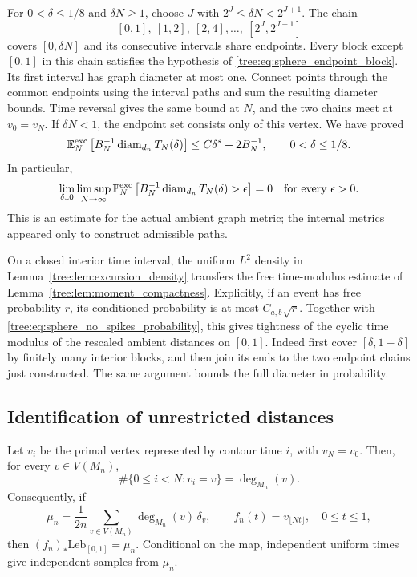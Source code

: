 For $0<\delta\leq1/8$ and $\delta N\geq1$, choose $J$ with
$2^J\leq\delta N<2^{J+1}$.  The chain
\[
 [0,1],\ [1,2],\ [2,4],\ldots,\ [2^J,2^{J+1}]
\]
covers $[0,\delta N]$ and its consecutive intervals share endpoints.
Every block except $[0,1]$ in this chain satisfies the hypothesis of
\eqref{tree:eq:sphere_endpoint_block}.  Its first interval has graph
diameter at most one.  Connect points through the common endpoints
using the interval paths and sum the resulting diameter bounds.
Time reversal gives the same bound at $N$, and the two chains meet
at $v_0=v_N$.  If $\delta N<1$, the endpoint set consists only of this
vertex.  We have proved
\begin{equation}\label{tree:eq:sphere_no_spikes}
 \mathbb E_N^{\mathrm{exc}}\left[B_N^{-1}\operatorname{diam}_{d_n}T_N(\delta)\right]
       \leq C\delta^s+2B_N^{-1},\qquad 0<\delta\leq1/8.
\end{equation}
In particular,
\begin{equation}\label{tree:eq:sphere_no_spikes_probability}
 \lim_{\delta\downarrow0}\limsup_{N\to\infty}
 \mathbb P_N^{\mathrm{exc}}\left[
       B_N^{-1}\operatorname{diam}_{d_n}T_N(\delta)>\epsilon\right]=0
       \quad\text{for every }\epsilon>0.
\end{equation}
This is an estimate for the actual ambient graph metric; the internal
metrics appeared only to construct admissible paths.

On a closed interior time interval, the uniform $L^2$ density in
Lemma~\ref{tree:lem:excursion_density} transfers the free time-modulus
estimate of Lemma~\ref{tree:lem:moment_compactness}.  Explicitly, if an event
has free probability $r$, its conditioned probability is at most
$C_{a,b}\sqrt r$.  Together with
\eqref{tree:eq:sphere_no_spikes_probability}, this gives tightness of the
cyclic time modulus of the rescaled ambient distances on $[0,1]$.
Indeed first cover $[\delta,1-\delta]$ by finitely many interior blocks,
and then join its ends to the two endpoint chains just constructed.
The same argument bounds the full diameter in probability.

\subsection{Identification of unrestricted distances}

\begin{lemma}
\label{tree:lem:tour_measure}
Let $v_i$ be the primal vertex represented by contour time $i$, with
$v_N=v_0$. Then, for every $v\in V(M_n)$,
\begin{equation}\label{tree:eq:tour_degree}
 \#\{0\leq i<N:v_i=v\}=\deg_{M_n}(v).
\end{equation}
Consequently, if
\[
 \mu_n=\frac1{2n}\sum_{v\in V(M_n)}\deg_{M_n}(v)\,\delta_v,
 \qquad f_n(t)=v_{\lfloor Nt\rfloor},\quad 0\leq t\leq1,
\]
then $(f_n)_*\mathrm{Leb}_{[0,1]}=\mu_n$. Conditional on the map,
independent uniform times give independent samples from $\mu_n$.
\end{lemma}

